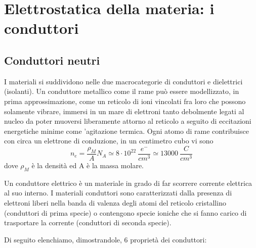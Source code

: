 \documentclass[
10pt, %
a4paper, %
oneside, %
headinclude,footinclude, %
BCOR5mm, %
]{scrartcl}
\begin{document}
\section{Elettrostatica della materia: i conduttori}
\subsection{Conduttori neutri}
I materiali si suddividono nelle due macrocategorie di conduttori e dielettrici (isolanti). Un conduttore metallico come il rame può essere modellizzato, in prima approssimazione, come un reticolo di ioni vincolati fra loro che possono solamente vibrare, immersi in un mare di elettroni tanto debolmente legati al nucleo da poter muoversi liberamente attorno al reticolo a seguito di eccitazioni energetiche minime come 'agitazione termica. Ogni atomo di rame contribuisce con circa un elettrone di conduzione, in un centimetro cubo vi sono
\[n_e = \frac{\rho_M }{A}N_A \simeq 8\cdot 10^22\ \frac{e^-}{cm^3}\simeq13000\ \frac{C}{cm^3}\]
dove $\rho_M$ è la densità ed A è la massa molare.
\begin{definizione}
	Un conduttore elettrico è un materiale in grado di far scorrere corrente elettrica al suo interno. I materiali conduttori sono caratterizzati dalla presenza di elettroni liberi nella banda di valenza degli atomi del reticolo cristallino (conduttori di prima specie) o contengono specie ioniche che si fanno carico di trasportare la corrente (conduttori di seconda specie).
\end{definizione}
Di seguito elenchiamo, dimostrandole, 6 proprietà dei conduttori:
\end{document}
